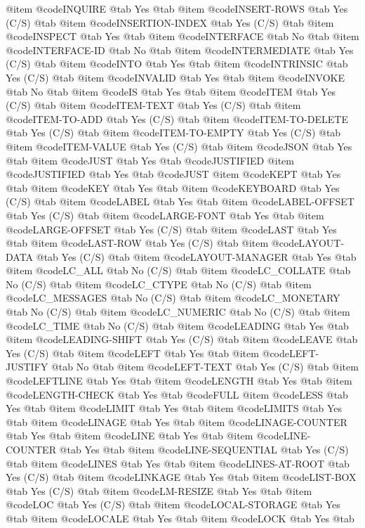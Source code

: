 @item @code{INQUIRE} @tab Yes @tab 
@item @code{INSERT-ROWS} @tab Yes	(C/S) @tab 
@item @code{INSERTION-INDEX} @tab Yes	(C/S) @tab 
@item @code{INSPECT} @tab Yes @tab 
@item @code{INTERFACE} @tab No @tab 
@item @code{INTERFACE-ID} @tab No @tab 
@item @code{INTERMEDIATE} @tab Yes	(C/S) @tab 
@item @code{INTO} @tab Yes @tab 
@item @code{INTRINSIC} @tab Yes	(C/S) @tab 
@item @code{INVALID} @tab Yes @tab 
@item @code{INVOKE} @tab No @tab 
@item @code{IS} @tab Yes @tab 
@item @code{ITEM} @tab Yes	(C/S) @tab 
@item @code{ITEM-TEXT} @tab Yes	(C/S) @tab 
@item @code{ITEM-TO-ADD} @tab Yes	(C/S) @tab 
@item @code{ITEM-TO-DELETE} @tab Yes	(C/S) @tab 
@item @code{ITEM-TO-EMPTY} @tab Yes	(C/S) @tab 
@item @code{ITEM-VALUE} @tab Yes	(C/S) @tab 
@item @code{JSON} @tab Yes @tab 
@item @code{JUST} @tab Yes @tab @code{JUSTIFIED}
@item @code{JUSTIFIED} @tab Yes @tab @code{JUST}
@item @code{KEPT} @tab Yes @tab 
@item @code{KEY} @tab Yes @tab 
@item @code{KEYBOARD} @tab Yes	(C/S) @tab 
@item @code{LABEL} @tab Yes @tab 
@item @code{LABEL-OFFSET} @tab Yes	(C/S) @tab 
@item @code{LARGE-FONT} @tab Yes @tab 
@item @code{LARGE-OFFSET} @tab Yes	(C/S) @tab 
@item @code{LAST} @tab Yes @tab 
@item @code{LAST-ROW} @tab Yes	(C/S) @tab 
@item @code{LAYOUT-DATA} @tab Yes	(C/S) @tab 
@item @code{LAYOUT-MANAGER} @tab Yes @tab 
@item @code{LC_ALL} @tab No	(C/S) @tab 
@item @code{LC_COLLATE} @tab No	(C/S) @tab 
@item @code{LC_CTYPE} @tab No	(C/S) @tab 
@item @code{LC_MESSAGES} @tab No	(C/S) @tab 
@item @code{LC_MONETARY} @tab No	(C/S) @tab 
@item @code{LC_NUMERIC} @tab No	(C/S) @tab 
@item @code{LC_TIME} @tab No	(C/S) @tab 
@item @code{LEADING} @tab Yes @tab 
@item @code{LEADING-SHIFT} @tab Yes	(C/S) @tab 
@item @code{LEAVE} @tab Yes	(C/S) @tab 
@item @code{LEFT} @tab Yes @tab 
@item @code{LEFT-JUSTIFY} @tab No @tab 
@item @code{LEFT-TEXT} @tab Yes	(C/S) @tab 
@item @code{LEFTLINE} @tab Yes @tab 
@item @code{LENGTH} @tab Yes @tab 
@item @code{LENGTH-CHECK} @tab Yes @tab @code{FULL}
@item @code{LESS} @tab Yes @tab 
@item @code{LIMIT} @tab Yes @tab 
@item @code{LIMITS} @tab Yes @tab 
@item @code{LINAGE} @tab Yes @tab 
@item @code{LINAGE-COUNTER} @tab Yes @tab 
@item @code{LINE} @tab Yes @tab 
@item @code{LINE-COUNTER} @tab Yes @tab 
@item @code{LINE-SEQUENTIAL} @tab Yes	(C/S) @tab 
@item @code{LINES} @tab Yes @tab 
@item @code{LINES-AT-ROOT} @tab Yes	(C/S) @tab 
@item @code{LINKAGE} @tab Yes @tab 
@item @code{LIST-BOX} @tab Yes	(C/S) @tab 
@item @code{LM-RESIZE} @tab Yes @tab 
@item @code{LOC} @tab Yes	(C/S) @tab 
@item @code{LOCAL-STORAGE} @tab Yes @tab 
@item @code{LOCALE} @tab Yes @tab 
@item @code{LOCK} @tab Yes @tab 
